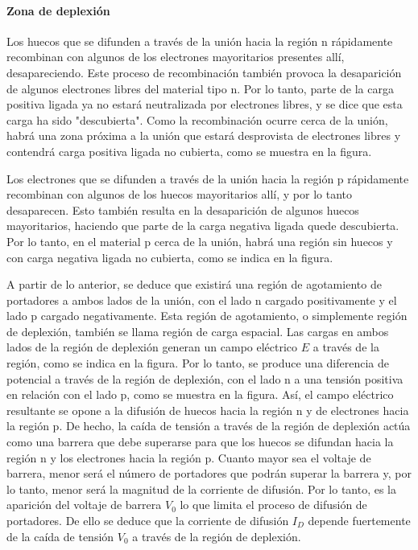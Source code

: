 \paragraph*{Zona de deplexión}Los huecos que se difunden a través de la unión hacia la región n rápidamente recombinan con algunos de los electrones mayoritarios presentes allí, desapareciendo. Este proceso de recombinación también provoca la desaparición de algunos electrones libres del material tipo n. Por lo tanto, parte de la carga positiva ligada ya no estará neutralizada por electrones libres, y se dice que esta carga ha sido "descubierta". Como la recombinación ocurre cerca de la unión, habrá una zona próxima a la unión que estará desprovista de electrones libres y contendrá carga positiva ligada no cubierta, como se muestra en la figura.

Los electrones que se difunden a través de la unión hacia la región p rápidamente recombinan con algunos de los huecos mayoritarios allí, y por lo tanto desaparecen. Esto también resulta en la desaparición de algunos huecos mayoritarios, haciendo que parte de la carga negativa ligada quede descubierta. Por lo tanto, en el material p cerca de la unión, habrá una región sin huecos y con carga negativa ligada no cubierta, como se indica en la figura.

A partir de lo anterior, se deduce que existirá una región de agotamiento de portadores a ambos lados de la unión, con el lado n cargado positivamente y el lado p cargado negativamente. Esta región de agotamiento, o simplemente región de deplexión, también se llama región de carga espacial. Las cargas en ambos lados de la región de deplexión generan un campo eléctrico \(E\) a través de la región, como se indica en la figura. Por lo tanto, se produce una diferencia de potencial a través de la región de deplexión, con el lado n a una tensión positiva en relación con el lado p, como se muestra en la figura. Así, el campo eléctrico resultante se opone a la difusión de huecos hacia la región n y de electrones hacia la región p. De hecho, la caída de tensión a través de la región de deplexión actúa como una barrera que debe superarse para que los huecos se difundan hacia la región n y los electrones hacia la región p. Cuanto mayor sea el voltaje de barrera, menor será el número de portadores que podrán superar la barrera y, por lo tanto, menor será la magnitud de la corriente de difusión. Por lo tanto, es la aparición del voltaje de barrera \(V_0\) lo que limita el proceso de difusión de portadores. De ello se deduce que la corriente de difusión \(I_D\) depende fuertemente de la caída de tensión \(V_0\) a través de la región de deplexión.

